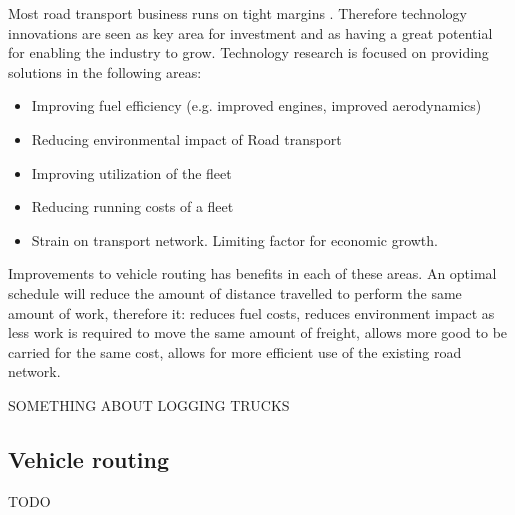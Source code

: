 % 

Most road transport business runs on tight margins \cite{NEED A CITE FOR THIS}. Therefore technology innovations are seen as key area for investment and as having a great potential for enabling the industry to grow. Technology research is focused on providing solutions in the following areas:
\begin{itemize}
	\item Improving fuel efficiency (e.g. improved engines, improved aerodynamics)
	\item Reducing environmental impact of Road transport
	\item Improving utilization of the fleet
	\item Reducing running costs of a fleet
	\item Strain on transport network. Limiting factor for economic growth.
\end{itemize}

Improvements to vehicle routing has benefits in each of these areas. An optimal schedule will reduce the amount of distance travelled to perform the same amount of work, therefore it: reduces fuel costs, reduces environment impact as less work is required to move the same amount of freight, allows more good to be carried for the same cost, allows for more efficient use of the existing road network.  

SOMETHING ABOUT LOGGING TRUCKS

\subsection{Vehicle routing}


TODO
